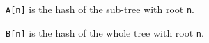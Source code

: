 \texttt{A[n]} is the hash of the sub-tree with root \texttt{n}.

\texttt{B[n]} is the hash of the whole tree with root \texttt{n}.


